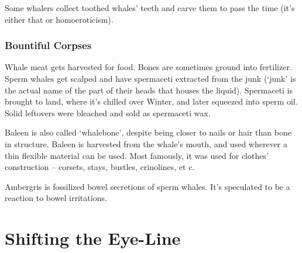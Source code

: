 \begin{multicols}{2}
Some whalers collect toothed whales' teeth and carve them to pass the time (it's either that or homoeroticism).

\subsubsection{Bountiful Corpses}

Whale meat gets harvested for food.
Bones are sometimes ground into fertilizer.
Sperm whales get scalped and have spermaceti extracted from the junk
(`junk' is the actual name of the part of their heads that houses the liquid).
Spermaceti is brought to land, where it's chilled over Winter, and later squeezed into sperm oil.
Solid leftovers were bleached and sold as spermaceti wax.

Baleen is also called `whalebone', despite being closer to nails or hair than bone in structure.
Baleen is harvested from the whale's mouth, and used wherever a thin flexible material can be used.
Most famously, it was used for clothes' construction -- corsets, stays, bustles, crinolines, et c.

Ambergris is fossilized bowel secretions of sperm whales.
It's speculated to be a reaction to bowel irritations.

\end{multicols}

\clearpage

\section*{Shifting the Eye-Line}

